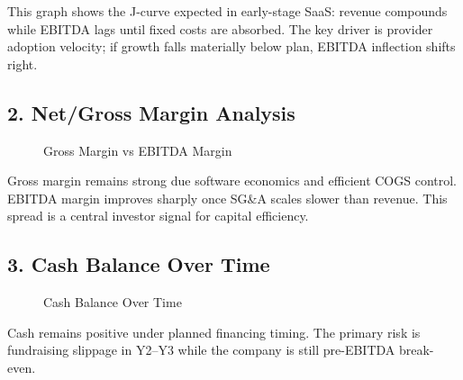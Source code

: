 \documentclass[11pt]{article}
\begin{document}
This graph shows the J-curve expected in early-stage SaaS: revenue compounds while EBITDA lags until fixed costs are absorbed. The key driver is provider adoption velocity; if growth falls materially below plan, EBITDA inflection shifts right.

\subsection*{2. Net/Gross Margin Analysis}
\begin{figure}[h]
\centering
{}
\caption{Gross Margin vs EBITDA Margin}
\end{figure}

Gross margin remains strong due software economics and efficient COGS control. EBITDA margin improves sharply once SG\&A scales slower than revenue. This spread is a central investor signal for capital efficiency.

\subsection*{3. Cash Balance Over Time}
\begin{figure}[h]
\centering
{}
\caption{Cash Balance Over Time}
\end{figure}

Cash remains positive under planned financing timing. The primary risk is fundraising slippage in Y2--Y3 while the company is still pre-EBITDA break-even.
\end{document}
